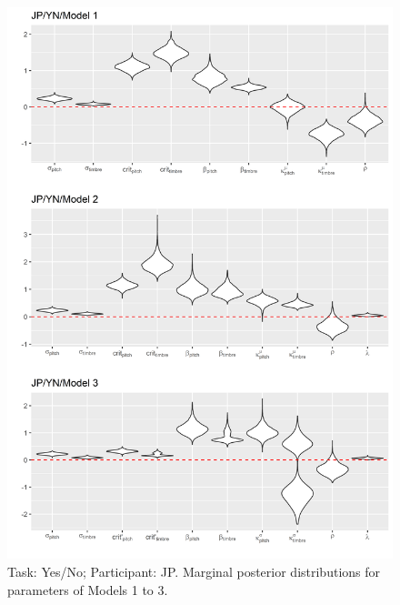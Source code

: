 \documentclass{article}\usepackage{knitr}
\begin{document}
\begin{figure}[H]
\centering
\includegraphics[scale=0.75, angle = 0]{Analysis_of_Human_Data/JP_YN_Basic_models}
\caption{Task: Yes/No; Participant: JP. Marginal posterior distributions for parameters of Models 1 to 3.}
\label{fig:JP_YN_Basic_models}
\end{figure}
\end{document}
